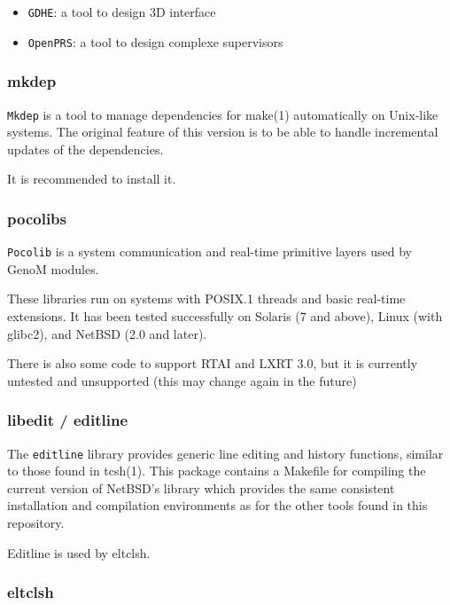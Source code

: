 \begin{itemize}
\item \texttt{GDHE}: a tool to design 3D interface
\item \texttt{OpenPRS}: a tool to design complexe supervisors
\end{itemize}

\subsubsection{mkdep}

\texttt{Mkdep} is a tool to manage dependencies for make(1) automatically on
Unix-like systems.  The original feature of this version is to be able to
handle incremental updates of the dependencies.

It is recommended to install it.

\subsubsection{pocolibs}

\texttt{Pocolib} is a system communication and real-time primitive layers used by
GenoM modules. 

These libraries run on systems with POSIX.1 threads and basic real-time
extensions. It has been tested successfully on Solaris (7 and above),
Linux (with glibc2), and NetBSD (2.0 and later). 

There is also some code to support RTAI and LXRT 3.0, but it is currently
untested and unsupported (this may change again in the future) 

\subsubsection{libedit / editline}

The \texttt{editline} library provides generic line editing and history
functions, similar to those found in tcsh(1). This package contains a
Makefile for compiling the current version of NetBSD's library which
provides the same consistent installation and compilation environments as
for the other tools found in this repository. 

Editline is used by eltclsh.

\subsubsection{eltclsh}


